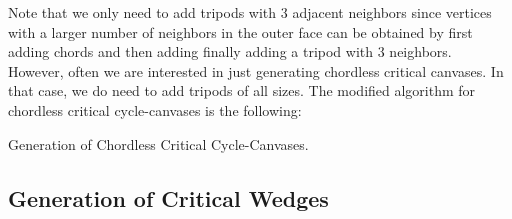 

Note that we only need to add tripods with $3$ adjacent neighbors since vertices with a larger number of neighbors in the
outer face can be obtained by first adding chords and then adding finally adding a tripod with $3$ neighbors. However, 
often we are interested in just generating chordless critical canvases. In that case, we do need to add tripods of all sizes.
The modified algorithm for chordless critical cycle-canvases is the following:

\begin{algorithm}[H]
\caption{Generation of Chordless Critical Cycle-Canvases.}
\SetAlgoLined
{}



\end{algorithm}


\subsection{Generation of Critical Wedges}



